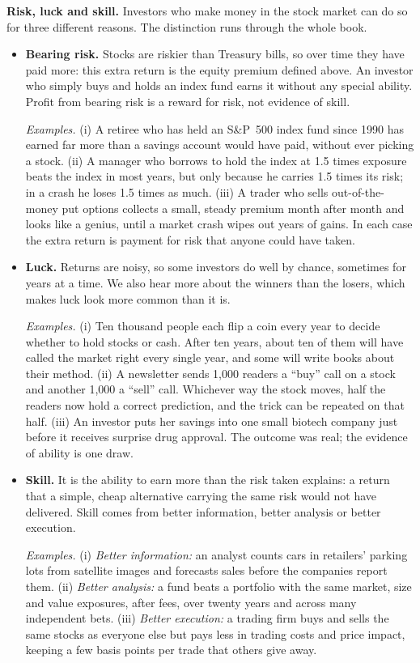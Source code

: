 \textbf{Risk, luck and skill.} Investors who make money in the stock market can do so for three different reasons. The distinction runs through the whole book.


\begin{itemize}
  \item \textbf{Bearing risk.} Stocks are riskier than Treasury bills, so over
  time they have paid more: this extra return is the equity premium defined
  above. An investor who simply buys and holds an index fund earns it without
  any special ability. Profit from bearing risk is a reward for risk, not
  evidence of skill.

  \emph{Examples.} (i) A retiree who has held an S\&P~500 index fund since
  1990 has earned far more than a savings account would have paid, without
  ever picking a stock. (ii) A manager who borrows to hold the index at
  1.5 times exposure beats the index in most years, but only because he
  carries 1.5 times its risk; in a crash he loses 1.5 times as much.
  (iii) A trader who sells out-of-the-money put options collects a small,
  steady premium month after month and looks like a genius, until a market
  crash wipes out years of gains. In each case the extra return is payment
  for risk that anyone could have taken.

  \item \textbf{Luck.} Returns are noisy, so some investors do well by
  chance, sometimes for years at a time. We also hear more about the winners
  than the losers, which makes luck look more common than it is.

  \emph{Examples.} (i) Ten thousand people each flip a coin every year to
  decide whether to hold stocks or cash. After ten years, about ten of them
  will have called the market right every single year, and some will write
  books about their method. (ii) A newsletter sends 1{,}000 readers a
  ``buy'' call on a stock and another 1{,}000 a ``sell'' call. Whichever way
  the stock moves, half the readers now hold a correct prediction, and the
  trick can be repeated on that half. (iii) An investor puts her savings into
  one small biotech company just before it receives surprise drug approval.
  The outcome was real; the evidence of ability is one draw.

  \item \textbf{Skill.} It is the ability to earn more than the
  risk taken explains: a return that a simple, cheap alternative carrying the
  same risk would not have delivered. Skill comes from better information,
  better analysis or better execution.

  \emph{Examples.} (i) \emph{Better information:} an analyst counts cars in
  retailers' parking lots from satellite images and forecasts sales before
  the companies report them. (ii) \emph{Better analysis:} a fund beats a
  portfolio with the same market, size and value exposures, after fees, over
  twenty years and across many independent bets. (iii) \emph{Better
  execution:} a trading firm buys and sells the same stocks as everyone else
  but pays less in trading costs and price impact, keeping a few basis points
  per trade that others give away.
\end{itemize}

